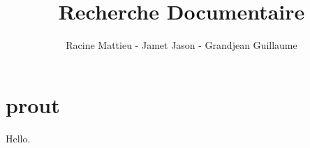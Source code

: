 \documentclass[11pt,a4paper]{article}
\title{Recherche Documentaire}
\author{Racine Mattieu - Jamet Jason - Grandjean Guillaume}
\date{}
\begin{document}
\maketitle
\tableofcontents

\newpage

\section{prout}
Hello.
\end{document}
